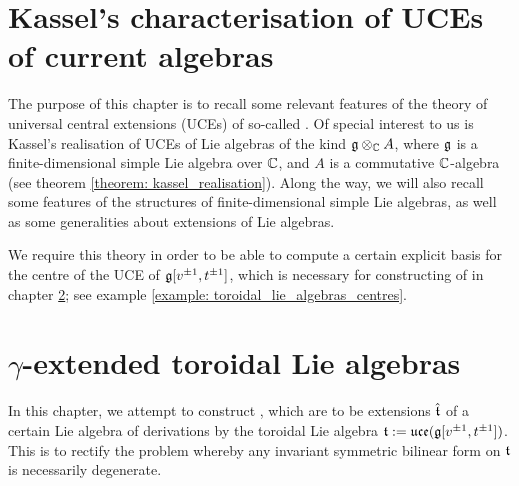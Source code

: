     \chapter{Kassel's characterisation of UCEs of current algebras} \label{chapter: kassel_UCEs}
        \begin{summary}
            The purpose of this chapter is to recall some relevant features of the theory of universal central extensions (UCEs) of so-called . Of special interest to us is Kassel's realisation of UCEs of Lie algebras of the kind $\g \tensor_{\bbC} A$, where $\mathfrak{g}$ is a finite-dimensional simple Lie algebra over $\mathbb{C}$, and $A$ is a commutative $\mathbb{C}$-algebra (see theorem \ref{theorem: kassel_realisation}). Along the way, we will also recall some features of the structures of finite-dimensional simple Lie algebras, as well as some generalities about extensions of Lie algebras.
            
            We require this theory in order to be able to compute a certain explicit basis for the centre of the UCE of $\mathfrak{g}[v^{\pm 1}, t^{\pm 1}]$, which is necessary for constructing of  in chapter \ref{chapter: yangian_EALAs}; see example \ref{example: toroidal_lie_algebras_centres}.
        \end{summary}

        \minitoc

        \newpage
    
        
        
        \newpage
        
        
        
        \newpage
        
        

    \newpage

    \chapter{\texorpdfstring{$\gamma$}{}-extended toroidal Lie algebras} \label{chapter: yangian_EALAs}
        \begin{summary}
            In this chapter, we attempt to construct , which are to be extensions $\hat{\mathfrak{t}}$ of a certain Lie algebra of derivations by the toroidal Lie algebra $\mathfrak{t} := \mathfrak{uce}(\mathfrak{g}[v^{\pm 1}, t^{\pm 1}])$. This is to rectify the problem whereby any invariant symmetric bilinear form on $\mathfrak{t}$ is necessarily degenerate.
        \end{summary}

